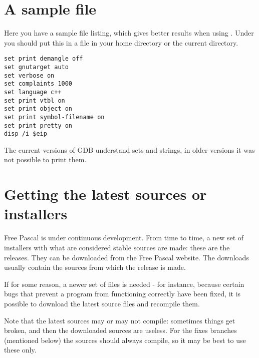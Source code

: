 

\chapter{A sample  file}
\label{ch:GdbIniFile}

Here you have a sample  file listing, which gives better
results when using . Under \linux you should put this in a
 file in your home directory or the current directory.

\begin{verbatim}
set print demangle off
set gnutarget auto
set verbose on
set complaints 1000
set language c++
set print vtbl on
set print object on
set print symbol-filename on
set print pretty on
disp /i $eip
\end{verbatim}
The current versions of GDB understand sets and strings, in older versions
it was not possible to print them.



\chapter{Getting the latest sources or installers}
\label{ch:sourcedownload}

Free Pascal is under continuous development. From time to time, a new
set of installers with what are considered stable sources are made: these
are the releases. They can be downloaded from the Free Pascal website.
The downloads usually contain the sources from which the release is made.

If for some reason, a newer set of files is needed - for instance, because
certain bugs that prevent a program from functioning correctly have been
fixed, it is possible to download the latest source files and recompile
them.

Note that the latest sources may or may not compile: sometimes things get
broken, and then the downloaded sources are useless. For the fixes branches
(mentioned below) the sources should always compile, so it may be best
to use these only.

